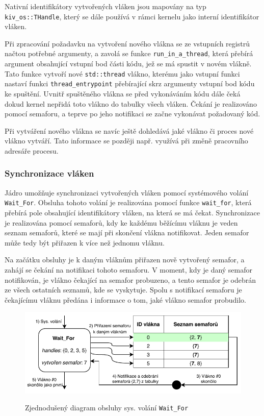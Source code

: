 \documentclass[12pt, a4paper]{article}
\begin{document}
Nativní identifikátory vytvořených vláken jsou mapovány na typ \texttt{kiv\_os::THandle}, který se dále používá v rámci kernelu jako interní identifikátor vláken.

Při zpracování požadavku na vytvoření nového vlákna se ze vstupních registrů načtou potřebné argumenty, a zavolá se funkce \texttt{run\_in\_a\_thread}, která přebírá argument obsahující vstupní bod části kódu, jež se má spustit v novém vlákně. Tato funkce vytvoří nové \texttt{std::thread} vlákno, kterému jako vstupní funkci nastaví funkci \texttt{thread\_entrypoint} přebírající skrz argumenty vstupní bod kódu ke spuštění. Uvnitř spuštěného vlákna se před vykonáváním kódu dále čeká dokud kernel nepřidá toto vlákno do tabulky všech vláken. Čekání je realizováno pomocí semaforu, a teprve po jeho notifikaci se začne vykonávat požadovaný kód. 

Při vytváření nového vlákna se navíc ještě dohledává jaké vlákno či proces nové vlákno vytváří. Tato informace se později např. využívá při změně pracovního adresáře procesu.

\subsubsection{Synchronizace vláken}
Jádro umožňuje synchronizaci vytvořených vláken pomocí systémového volání \texttt{Wait\_For}. Obsluha tohoto volání je realizována pomocí funkce \texttt{wait\_for}, která přebírá pole obsahující identifikátory vláken, na která se má čekat. Synchronizace je realizována pomocí semaforů, kdy ke každému běžícímu vláknu je veden seznam semaforů, které se mají při skončení vlákna notifikovat. Jeden semafor může tedy být přiřazen k více než jednomu vláknu. 

Na začátku obsluhy je k daným vláknům přiřazen nově vytvořený semafor, a zahájí se čekání na notifikaci tohoto semaforu. V moment, kdy je daný semafor notifikován, je vlákno čekající na semafor probuzeno, a tento semafor je odebrán ze všech ostatních seznamů, kde se vyskytuje. Spolu s notifikací semaforu je čekajícímu vláknu předána i informace o tom, jaké vlákno semafor probudilo. 

\begin{figure}[!ht]
\centering
{\includegraphics[width=14.5cm]{pdf/wait_for.pdf}}
\caption{Zjednodušený diagram obsluhy sys. volání \texttt{Wait\_For}}
\label{fig:screen-transition-diagram}
\end{figure}
\end{document}

